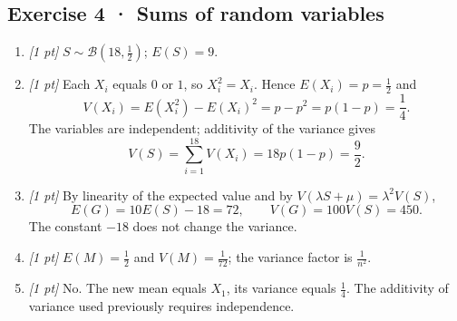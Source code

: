 \subsection*{Exercise 4 · Sums of random variables}\begin{enumerate}

\item \textit{[1 pt]} $S\sim\mathcal B(18,\frac{1}{2})$; $E(S)=9$.

\item \textit{[1 pt]} Each $X_i$ equals $0$ or $1$, so $X_i^2=X_i$. Hence $E(X_i)=p=\frac{1}{2}$ and
\[V(X_i)=E(X_i^2)-E(X_i)^2=p-p^2=p(1-p)=\frac{1}{4}.\]
The variables are independent; additivity of the variance gives
\[V(S)=\sum_{i=1}^{18}V(X_i)=18p(1-p)=\frac{9}{2}.\]

\item \textit{[1 pt]} By linearity of the expected value and by $V(\lambda S+\mu)=\lambda^2V(S)$,
\[E(G)=10E(S)-18=72,\qquad V(G)=100V(S)=450.\]
The constant $-18$ does not change the variance.

\item \textit{[1 pt]} $E(M)=\frac{1}{2}$ and $V(M)=\frac{1}{72}$; the variance factor is $\frac{1}{n^2}$.

\item \textit{[1 pt]} No. The new mean equals $X_1$, its variance equals $\frac{1}{4}$. The additivity of variance used previously requires independence.

\end{enumerate}

\fi

\fi

